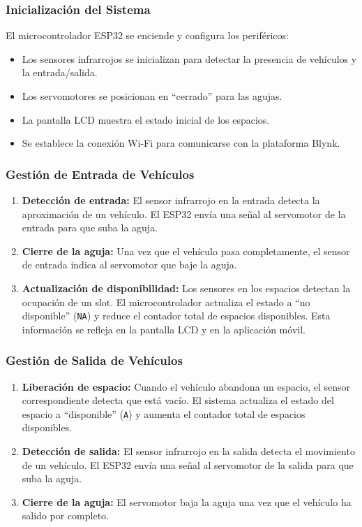 \documentclass[12pt,a4paper]{article}
\begin{document}
\subsubsection{Inicialización del Sistema}
El microcontrolador ESP32 se enciende y configura los periféricos:
    \begin{itemize}
        \item Los sensores infrarrojos se inicializan para detectar la presencia de vehículos y la entrada/salida.
        \item Los servomotores se posicionan en ``cerrado'' para las agujas.
        \item La pantalla LCD muestra el estado inicial de los espacios.
        \item Se establece la conexión Wi-Fi para comunicarse con la plataforma Blynk.
    \end{itemize}

\subsubsection{Gestión de Entrada de Vehículos}
\begin{enumerate}
    \item \textbf{Detección de entrada:}  
    El sensor infrarrojo en la entrada detecta la aproximación de un vehículo. El ESP32 envía una señal al servomotor de la entrada para que suba la aguja. 

    \item \textbf{Cierre de la aguja:}  
    Una vez que el vehículo pasa completamente, el sensor de entrada indica al servomotor que baje la aguja.
    
    \item \textbf{Actualización de disponibilidad:}  
    Los sensores en los espacios detectan la ocupación de un slot. El microcontrolador actualiza el estado a ``no disponible'' (\texttt{NA}) y reduce el contador total de espacios disponibles. Esta información se refleja en la pantalla LCD y en la aplicación móvil.
    

\end{enumerate}

\subsubsection{Gestión de Salida de Vehículos}
\begin{enumerate}
    \item \textbf{Liberación de espacio:}  
    Cuando el vehículo abandona un espacio, el sensor correspondiente detecta que está vacío. El sistema actualiza el estado del espacio a ``disponible'' (\texttt{A}) y aumenta el contador total de espacios disponibles.
    
    \item \textbf{Detección de salida:}  
    El sensor infrarrojo en la salida detecta el movimiento de un vehículo. El ESP32 envía una señal al servomotor de la salida para que suba la aguja.
    
    \item \textbf{Cierre de la aguja:}  
    El servomotor baja la aguja una vez que el vehículo ha salido por completo.
\end{enumerate}
\end{document}
